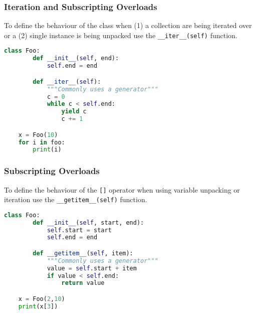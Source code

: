 \documentclass{beamer}
\begin{document}
%
%
\begin{frame}[fragile]
    \frametitle{Iteration and Subscripting Overloads }
    To define the behaviour of the class when (1) a collection are being iterated over or a (2) single instance is being unpacked use the \lstinline|__iter__(self)| function.
    \begin{lstlisting}[language=Python, autogobble]
    class Foo:
        def __init__(self, end):
            self.end = end

        def __iter__(self):
            """Commonly uses a generator"""
            c = 0
            while c < self.end:
                yield c
                c += 1

    x = Foo(10)
    for i in foo:
        print(i)
    \end{lstlisting}
\end{frame}


%
%
\begin{frame}[fragile]
    \frametitle{Subscripting Overloads}
    To define the behaviour of the \lstinline|[]| operator when using variable unpacking or iteration use the \lstinline|__getitem__(self)| function.

    \begin{lstlisting}[language=Python, autogobble]
    class Foo:
        def __init__(self, start, end):
            self.start = start
            self.end = end

        def __getitem__(self, item):
            """Commonly uses a generator"""
            value = self.start + item 
            if value < self.end:
                return value

    x = Foo(2,10)
    print(x[3])
    \end{lstlisting}
\end{frame}
\end{document}
